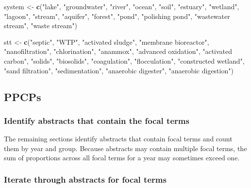 \documentclass[
]{article}
\newenvironment{Shaded}{\begin{snugshade}}{\end{snugshade}}
\newcommand{\KeywordTok}[1]{\textcolor[rgb]{0.13,0.29,0.53}{\textbf{#1}}}
\newcommand{\NormalTok}[1]{#1}
\newcommand{\StringTok}[1]{\textcolor[rgb]{0.31,0.60,0.02}{#1}}
\begin{document}
\begin{Shaded}
\begin{Highlighting}[]
\NormalTok{system <-}\StringTok{ }\KeywordTok{c}\NormalTok{(}\StringTok{"lake"}\NormalTok{, }\StringTok{"groundwater"}\NormalTok{, }\StringTok{"river"}\NormalTok{, }\StringTok{"ocean"}\NormalTok{, }\StringTok{"soil"}\NormalTok{, }\StringTok{"estuary"}\NormalTok{, }\StringTok{"wetland"}\NormalTok{, }
            \StringTok{"lagoon"}\NormalTok{, }\StringTok{"stream"}\NormalTok{, }\StringTok{"aquifer"}\NormalTok{, }\StringTok{"forest"}\NormalTok{, }\StringTok{"pond"}\NormalTok{, }\StringTok{"polishing pond"}\NormalTok{, }
            \StringTok{"wastewater stream"}\NormalTok{, }\StringTok{"waste stream"}\NormalTok{)}


\NormalTok{stt <-}\StringTok{ }\KeywordTok{c}\NormalTok{(}\StringTok{"septic"}\NormalTok{, }\StringTok{"WTP"}\NormalTok{, }\StringTok{"activated sludge"}\NormalTok{, }\StringTok{"membrane bioreactor"}\NormalTok{, }\StringTok{"nanofiltration"}\NormalTok{, }
         \StringTok{"chlorination"}\NormalTok{, }\StringTok{"anammox"}\NormalTok{, }\StringTok{"advanced oxidation"}\NormalTok{, }\StringTok{"activated carbon"}\NormalTok{,}
         \StringTok{"solids"}\NormalTok{, }\StringTok{"biosolids"}\NormalTok{, }\StringTok{"coagulation"}\NormalTok{, }\StringTok{"flocculation"}\NormalTok{, }\StringTok{"constructed wetland"}\NormalTok{,}
         \StringTok{"sand filtration"}\NormalTok{, }\StringTok{"sedimentation"}\NormalTok{, }\StringTok{"anaerobic digester"}\NormalTok{, }\StringTok{"anaerobic digestion"}\NormalTok{)}
\end{Highlighting}
\end{Shaded}

\hypertarget{ppcps}{%
\subsection{PPCPs}\label{ppcps}}

\hypertarget{identify-abstracts-that-contain-the-focal-terms}{%
\subsubsection{Identify abstracts that contain the focal
terms}\label{identify-abstracts-that-contain-the-focal-terms}}

The remaining sections identify abstracts that contain focal terms and
count them by year and group. Because abstracts may contain multiple
focal terms, the sum of proportions across all focal terms for a year
may sometimes exceed one.

\hypertarget{iterate-through-abstracts-for-focal-terms}{%
\subsubsection{Iterate through abstracts for focal
terms}\label{iterate-through-abstracts-for-focal-terms}}
\end{document}
